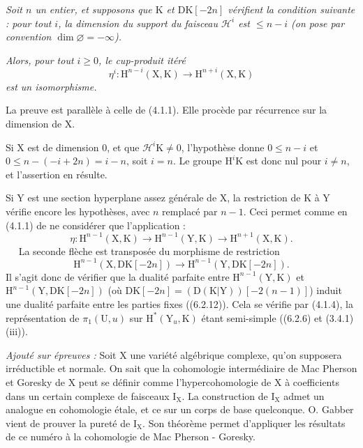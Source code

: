 \documentclass[11pt,leqno]{article}
\newcommand{\Page}[1]{\ifvmode\noindent\else\unskip\ \fi{\footnotesize\textcolor{gray}{[p.\,#1]}}\ \ignorespaces}
\begin{document}
\textit{Soit \(n\) un entier, et supposons que \(\mathrm{K}\) et \(\mathrm{DK}[-2n]\) vérifient la condition suivante : pour tout \(i\), la dimension du support du faisceau \(\mathscr{H}^i\) est \(\leq n-i\) (on pose par convention \(\dim\varnothing=-\infty\)).}

\textit{Alors, pour tout \(i\geq0\), le cup-produit itéré}
\[
\eta^i:\mathrm{H}^{n-i}(\mathrm{X},\mathrm{K})
\to
\mathrm{H}^{n+i}(\mathrm{X},\mathrm{K})
\]
\textit{est un isomorphisme.}

\medskip
La preuve est parallèle à celle de (4.1.1). Elle procède par récurrence sur la dimension de \(\mathrm{X}\).

Si \(\mathrm{X}\) est de dimension \(0\), et que \(\mathscr{H}^i\mathrm{K}\neq0\), l’hypothèse donne \(0\leq n-i\) et \(0\leq n-(-i+2n)=i-n\), soit \(i=n\). Le groupe \(\mathrm{H}^i\mathrm{K}\) est donc nul pour \(i\neq n\), et l’assertion en résulte.

Si \(\mathrm{Y}\) est une section hyperplane assez générale de \(\mathrm{X}\), la restriction de \(\mathrm{K}\) à \(\mathrm{Y}\) vérifie encore les hypothèses, avec \(n\) remplacé par \(n-1\). Ceci permet comme en (4.1.1) de ne considérer que l’application :
\[
\eta:\mathrm{H}^{n-1}(\mathrm{X},\mathrm{K})
\to
\mathrm{H}^{n-1}(\mathrm{Y},\mathrm{K})
\to
\mathrm{H}^{n+1}(\mathrm{X},\mathrm{K}).
\]
\Page{251}
La seconde flèche est transposée du morphisme de restriction
\[
\mathrm{H}^{n-1}(\mathrm{X},\mathrm{DK}[-2n])
\to
\mathrm{H}^{n-1}(\mathrm{Y},\mathrm{DK}[-2n]).
\]
Il s’agit donc de vérifier que la dualité parfaite entre \(\mathrm{H}^{n-1}(\mathrm{Y},\mathrm{K})\) et \(\mathrm{H}^{n-1}(\mathrm{Y},\mathrm{DK}[-2n])\) (où \(\mathrm{DK}[-2n]=(\mathrm{D}(\mathrm{K}|\mathrm{Y}))[-2(n-1)]\)) induit une dualité parfaite entre les parties fixes ((6.2.12)). Cela se vérifie par (4.1.4), la représentation de \(\pi_1(\mathrm{U},u)\) sur \(\mathrm{H}^*(\mathrm{Y}_u,\mathrm{K})\) étant semi-simple ((6.2.6) et (3.4.1) (iii)).

\medskip
\textit{Ajouté sur épreuves :} Soit \(\mathrm{X}\) une variété algébrique complexe, qu’on supposera irréductible et normale. On sait que la cohomologie intermédiaire de Mac Pherson et Goresky de \(\mathrm{X}\) peut se définir comme l’hypercohomologie de \(\mathrm{X}\) à coefficients dans un certain complexe de faisceaux \(\mathrm{I}_{\mathrm{X}}\). La construction de \(\mathrm{I}_{\mathrm{X}}\) admet un analogue en cohomologie étale, et ce sur un corps de base quelconque. O. Gabber vient de prouver la pureté de \(\mathrm{I}_{\mathrm{X}}\). Son théorème permet d’appliquer les résultats de ce numéro à la cohomologie de Mac Pherson - Goresky.
\end{document}
